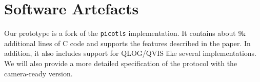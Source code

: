 %

\newpage
\section*{Software Artefacts}

Our \tcpls prototype is a fork of the \texttt{picotls}  implementation. It contains about 9k additional lines of C code and supports the features described in the paper. In addition, it also includes support for QLOG/QVIS \cite{marx2020debugging} like several \quic implementations. We will also provide a more detailed specification of the \tcpls protocol with the camera-ready version.



